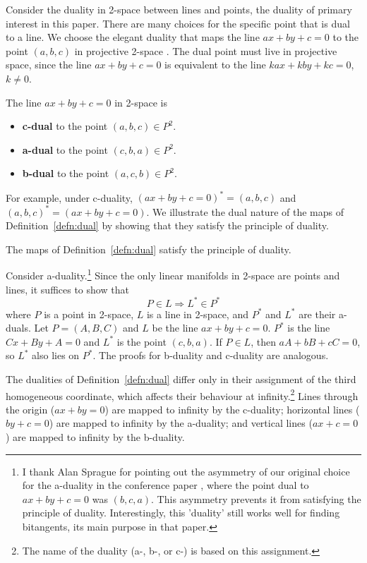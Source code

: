 \documentclass[12pt]{article}
\begin{document}
Consider the duality  in 2-space between lines and points,
the duality of primary interest in this paper.
There are many choices for the specific point that is dual to a line.
We choose the elegant duality that maps
the line $ax+by+c=0$ to the point $(a,b,c)$ in projective 2-space \cite{hartshorne77}.
The dual point must live in projective space,
since the line $ax + by + c = 0$ is equivalent to the line
$kax + kby + kc = 0$, $k \neq 0$.

\begin{defn2}
\label{defn:dual}
The line $ax+by+c=0$ in 2-space is 
\begin{itemize}
\item	{\bf c-dual} to the point $(a,b,c) \in P^2$.
\item   {\bf a-dual} to the point $(c,b,a) \in P^2$.
\item   {\bf b-dual} to the point $(a,c,b) \in P^2$.
\end{itemize}
\end{defn2}

For example, under c-duality, $(ax+by+c=0)^* = (a,b,c)$
and $(a,b,c)^* = (ax+by+c=0)$.
We illustrate the dual nature of the maps of Definition~\ref{defn:dual} by showing
that they satisfy the principle of duality.

\begin{lemma}
The maps of Definition~\ref{defn:dual} 
satisfy the principle of duality.
\end{lemma}
\prf
Consider a-duality.\footnote{I thank Alan Sprague for pointing out 
	the asymmetry of our original choice for the a-duality in the 
	conference paper \cite{jj01a}, 	where the point dual to $ax+by+c=0$ was $(b,c,a)$.
	This asymmetry prevents it from satisfying the principle of duality.
	Interestingly, this 'duality' still works
	well for finding bitangents, its main purpose in that paper.}
Since the only linear manifolds in 2-space are points and lines,
it suffices to show that 
\[	P \in L \Rightarrow L^* \in P^*
\]
where $P$ is a point in 2-space, $L$ is a line in 2-space, 
and $P^*$ and $L^*$ are their a-duals.
Let $P=(A,B,C)$ and $L$ be the line $ax+by+c=0$.
$P^*$ is the line $Cx+By+A=0$ and $L^*$ is the point $(c,b,a)$.
If $P \in L$, then $aA+bB+cC=0$,
so $L^*$ also lies on $P^*$.
The proofs for b-duality and c-duality are analogous.
\QED

The dualities of Definition~\ref{defn:dual} 
differ only in their assignment of the third homogeneous coordinate,
which affects their behaviour at infinity.\footnote{The
	name of the duality (a-, b-, or c-) is based on this assignment.}
Lines through the origin ($ax+by=0$) are mapped to infinity by the c-duality;
horizontal lines ($by+c=0$) are mapped to infinity by the a-duality;
and vertical lines ($ax+c=0$) are mapped to infinity by the b-duality.
\end{document}
